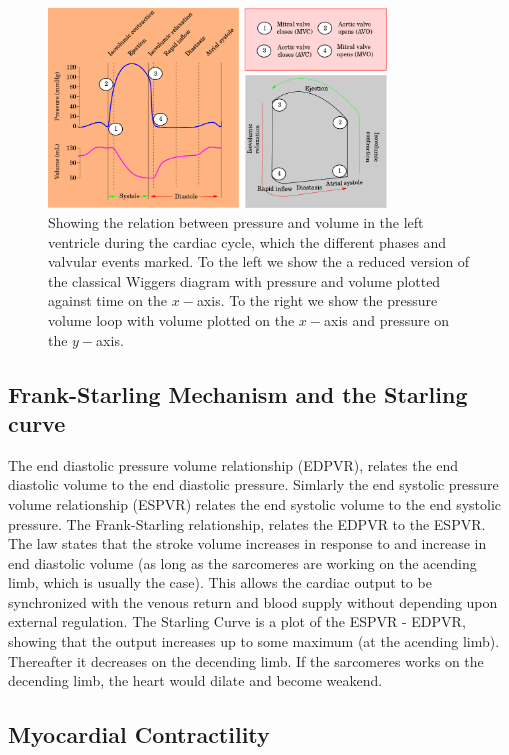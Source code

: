 \begin{figure}[htbp]
  \centering
    \includegraphics[width=0.8\textwidth]{chapters/introduction/figures/cardiac_cycle.png}
\caption{Showing the relation between pressure and volume in the left
  ventricle during the cardiac cycle, which the different phases and
  valvular events marked. To the left we show the a reduced version of
the classical Wiggers diagram with pressure and volume plotted against
time on the $x-$axis. To the right we show the pressure volume loop
with volume plotted on the $x-$axis and pressure on the $y-$axis. }
\label{fig:pv_loop}
\end{figure}



\subsection{Frank-Starling Mechanism and the Starling curve} 
The end diastolic pressure volume relationship (EDPVR), relates the end
diastolic volume to the end diastolic pressure. Simlarly the end
systolic pressure volume relationship (ESPVR) relates the end systolic
volume to the end systolic pressure. The Frank-Starling relationship,
relates the EDPVR to the ESPVR. The law states that the stroke volume
increases in response to and increase in end diastolic volume (as long
as the sarcomeres are working on the acending limb, which is usually
the case). This allows the cardiac output to be synchronized with the
venous return and blood supply without depending upon external
regulation.
The Starling Curve is a plot of the ESPVR - EDPVR, showing that the
output increases up to some maximum (at the acending limb). Thereafter
it decreases on the decending limb. If the sarcomeres works on the
decending limb, the heart would dilate and become weakend.

\subsection{Myocardial Contractility}


